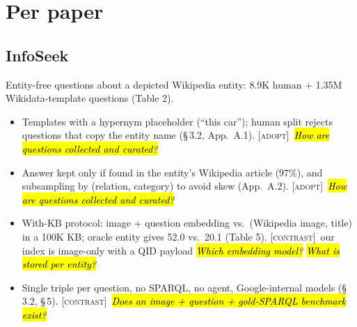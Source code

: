 \documentclass[10pt,a4paper]{article}
\newcommand{\adopt}{\textsc{[adopt]}}
\newcommand{\contrast}{\textsc{[contrast]}}
\newcommand{\q}[1]{\hl{\footnotesize\itshape #1}}
\begin{document}
\section{Per paper}
\subsection*{InfoSeek \cite{chen2023can}}
Entity-free questions about a depicted Wikipedia entity: 8.9K human +
1.35M Wikidata-template questions (Table 2).
\begin{itemize}
  \item Templates with a hypernym placeholder (``this car''); human
    split rejects questions that copy the entity name (\S\,3.2,
    App.~A.1). \adopt\ \q{How are questions collected and curated?}
  \item Answer kept only if found in the entity's Wikipedia article
    (97\%), and subsampling by (relation, category) to avoid skew
    (App.~A.2). \adopt\ \q{How are questions collected and curated?}
  \item With-KB protocol: image + question embedding vs.\ (Wikipedia
    image, title) in a 100K KB; oracle entity gives 52.0 vs.\ 20.1
    (Table 5). \contrast\ our index is image-only with a QID payload
    \q{Which embedding model?} \q{What is stored per entity?}
  \item Single triple per question, no SPARQL, no agent,
    Google-internal models (\S\,3.2, \S\,5). \contrast\ \q{Does an
    image + question + gold-SPARQL benchmark exist?}
\end{itemize}
\end{document}
